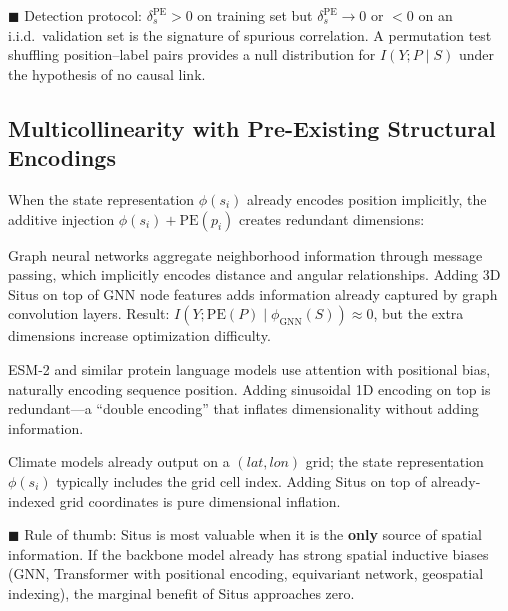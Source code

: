 \documentclass[12pt,a4paper]{article}
\begin{document}
\textcolor{warning}{$\blacksquare$ Detection protocol}: $\delta_s^{\mathrm{PE}} > 0$ on training set but $\delta_s^{\mathrm{PE}} \to 0$ or $< 0$ on an i.i.d.\ validation set is the signature of spurious correlation. A permutation test shuffling position--label pairs provides a null distribution for $I(Y; P \mid S)$ under the hypothesis of no causal link.

\subsection{Multicollinearity with Pre-Existing Structural Encodings}
\label{sec:multi}

When the state representation $\phi(s_i)$ already encodes position implicitly, the additive injection $\phi(s_i) + \mathrm{PE}(p_i)$ creates redundant dimensions:

\begin{description}[leftmargin=1.5cm]
\item[\textbf{GNN + Situs on crystals}.] Graph neural networks aggregate neighborhood information through message passing, which implicitly encodes distance and angular relationships. Adding 3D Situs on top of GNN node features adds information already captured by graph convolution layers. Result: $I(Y; \mathrm{PE}(P) \mid \phi_{\text{GNN}}(S)) \approx 0$, but the extra dimensions increase optimization difficulty.

\item[\textbf{pLM + Situs on proteins}.] ESM-2 and similar protein language models use attention with positional bias, naturally encoding sequence position. Adding sinusoidal 1D encoding on top is redundant—a ``double encoding'' that inflates dimensionality without adding information.

\item[\textbf{Climate model output statistics + Situs}.] Climate models already output on a $(lat,lon)$ grid; the state representation $\phi(s_i)$ typically includes the grid cell index. Adding Situs on top of already-indexed grid coordinates is pure dimensional inflation.
\end{description}

\textcolor{warning}{$\blacksquare$ Rule of thumb}: Situs is most valuable when it is the \textbf{only} source of spatial information. If the backbone model already has strong spatial inductive biases (GNN, Transformer with positional encoding\cite{vaswani2017}, equivariant network, geospatial indexing), the marginal benefit of Situs approaches zero.
\end{document}
